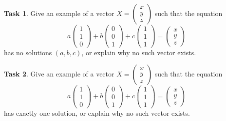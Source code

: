 \documentclass[10pt,]{book}
\theoremstyle{plain}
\theoremstyle{definition}
\numberwithin{equation}{section}
\newtheorem{task}{Task}[chapter]
\begin{document}
\begin{task}
\label{task-10}
Give an example of a vector \(X =
                  \begin{pmatrix} x \\ y \\ z\end{pmatrix}\) such that the
                  equation \[ a \begin{pmatrix} 1 \\ 1 \\ 0 \end{pmatrix} + b
                  \begin{pmatrix} 0 \\ 0 \\ 1\end{pmatrix} + c \begin{pmatrix} 1
                  \\ 1 \\ 1\end{pmatrix} = \begin{pmatrix}x \\ y \\ z \end{pmatrix}
                \] has no solutions \((a,b,c)\), or explain why no such vector
                  exists.%
\end{task}
\begin{task}
\label{task-11}
Give an example of a vector \(X = \begin{pmatrix} x \\ y \\ z\end{pmatrix}\) such that the equation \[ a \begin{pmatrix} 1 \\ 1 \\ 0 \end{pmatrix} + b \begin{pmatrix} 0 \\ 0 \\ 1\end{pmatrix} + c \begin{pmatrix} 1 \\ 1 \\ 1\end{pmatrix} = \begin{pmatrix}x \\ y \\ z \end{pmatrix}\] has exactly one solution, or explain why no such vector exists.%
\end{task}
\end{document}
